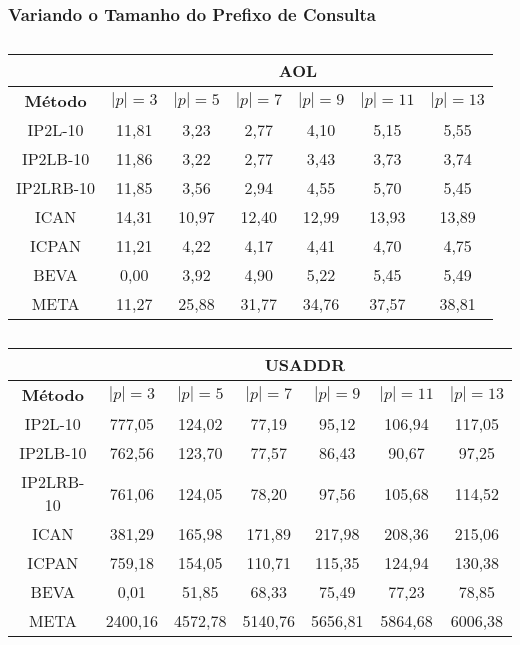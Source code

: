 \subsubsection{Variando o Tamanho do Prefixo de Consulta}


\begin{table}[]
\centering
\begin{tabular}{c|c|c|c|c|c|c|}
\cline{2-7}
\multicolumn{1}{l|}{} & \multicolumn{6}{c|}{\textbf{AOL}} \\ \hline
\multicolumn{1}{|c|}{\textbf{Método}} & $|p| =  3$ & $|p| =  5$ & $|p| =  7$ & $|p| =  9$ & $|p| =  11$ & $|p| =  13$ \\ \hline
\multicolumn{1}{|c|}{IP2L-10} & 11,81 & 3,23 & 2,77 & 4,10 & 5,15 & 5,55 \\ \hline
\multicolumn{1}{|c|}{IP2LB-10} & 11,86 & 3,22 & 2,77 & 3,43 & 3,73 & 3,74 \\ \hline
\multicolumn{1}{|c|}{IP2LRB-10} & 11,85 & 3,56 & 2,94 & 4,55 & 5,70 & 5,45 \\ \hline
\multicolumn{1}{|c|}{ICAN} & 14,31 & 10,97 & 12,40 & 12,99 & 13,93 & 13,89 \\ \hline
\multicolumn{1}{|c|}{ICPAN} & 11,21 & 4,22 & 4,17 & 4,41 & 4,70 & 4,75 \\ \hline
\multicolumn{1}{|c|}{BEVA} & 0,00 & 3,92 & 4,90 & 5,22 & 5,45 & 5,49 \\ \hline
\multicolumn{1}{|c|}{META} & 11,27 & 25,88 & 31,77 & 34,76 & 37,57 & 38,81 \\ \hline
\end{tabular}
\caption{}
\label{tab:baselines-varying-prefix-size-AOL}
\end{table}

\begin{table}[]
\centering
\begin{tabular}{c|c|c|c|c|c|c|}
\cline{2-7}
\multicolumn{1}{l|}{} & \multicolumn{6}{c|}{\textbf{USADDR}} \\ \hline
\multicolumn{1}{|c|}{\textbf{Método}} & $|p| =  3$ & $|p| =  5$ & $|p| =  7$ & $|p| =  9$ & $|p| =  11$ & $|p| =  13$ \\ \hline
\multicolumn{1}{|c|}{IP2L-10} & 777,05 & 124,02 & 77,19 & 95,12 & 106,94 & 117,05 \\ \hline
\multicolumn{1}{|c|}{IP2LB-10} & 762,56 & 123,70 & 77,57 & 86,43 & 90,67 & 97,25 \\ \hline
\multicolumn{1}{|c|}{IP2LRB-10} & 761,06 & 124,05 & 78,20 & 97,56 & 105,68 & 114,52 \\ \hline
\multicolumn{1}{|c|}{ICAN} & 381,29 & 165,98 & 171,89 & 217,98 & 208,36 & 215,06 \\ \hline
\multicolumn{1}{|c|}{ICPAN} & 759,18 & 154,05 & 110,71 & 115,35 & 124,94 & 130,38 \\ \hline
\multicolumn{1}{|c|}{BEVA} & 0,01 & 51,85 & 68,33 & 75,49 & 77,23 & 78,85 \\ \hline
\multicolumn{1}{|c|}{META} & 2400,16 & 4572,78 & 5140,76 & 5656,81 & 5864,68 & 6006,38 \\ \hline
\end{tabular}
\caption{}
\label{tab:baselines-varying-prefix-size-USADDR}
\end{table}

